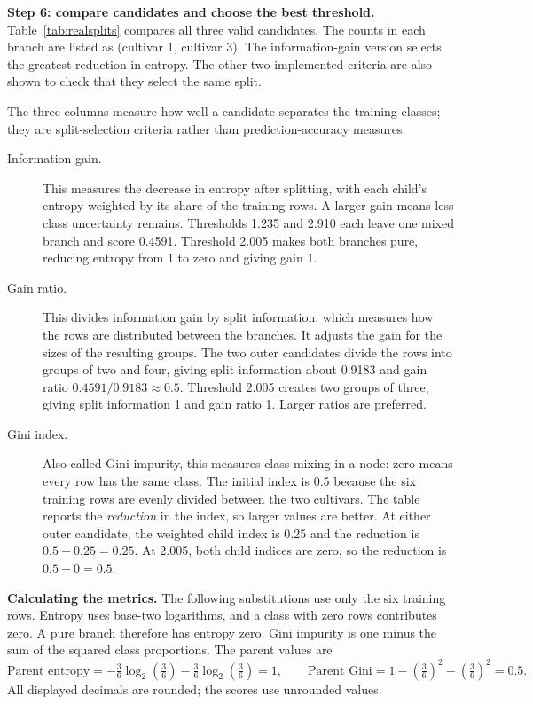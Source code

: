 \documentclass[11pt,letterpaper]{article}
\begin{document}
\textbf{Step 6: compare candidates and choose the best threshold.}
Table~\ref{tab:realsplits} compares all three valid candidates. The counts
in each branch are listed as (cultivar 1, cultivar 3). The information-gain
version selects the greatest reduction in entropy. The other two implemented
criteria are also shown to check that they select the same split.



The three columns measure how well a candidate separates the training
classes; they are split-selection criteria rather than prediction-accuracy
measures.
\begin{description}
\item[Information gain.] This measures the decrease in entropy after splitting,
with each child's entropy weighted by its share of the training rows.
A larger gain means less class uncertainty remains. Thresholds 1.235 and
2.910 each leave one mixed branch and score 0.4591. Threshold 2.005 makes
both branches pure, reducing entropy from 1 to zero and giving gain 1.
\item[Gain ratio.] This divides information gain by split information, which
measures how the rows are distributed between the branches. It adjusts the
gain for the sizes of the resulting groups. The two outer candidates divide
the rows into groups of two and four, giving split information about 0.9183
and gain ratio $0.4591/0.9183\approx0.5$. Threshold 2.005 creates two groups
of three, giving split information 1 and gain ratio 1. Larger ratios are
preferred.
\item[Gini index.] Also called Gini impurity, this measures class mixing in a
node: zero means every row has the same class. The initial index is 0.5
because the six training rows are evenly divided between the two cultivars.
The table reports the \emph{reduction} in the index, so larger values are
better. At either outer candidate, the weighted child index is 0.25 and
the reduction is $0.5-0.25=0.25$. At 2.005, both child indices are zero,
so the reduction is $0.5-0=0.5$.
\end{description}
\textbf{Calculating the metrics.}
The following substitutions use only the six training rows. Entropy uses
base-two logarithms, and a class with zero rows contributes zero. A pure
branch therefore has entropy zero. Gini impurity is one minus the sum of
the squared class proportions. The parent values are
\[
\text{Parent entropy}=-\tfrac36\log_2(\tfrac36)-\tfrac36\log_2(\tfrac36)=1,
\qquad
\text{Parent Gini}=1-(\tfrac36)^2-(\tfrac36)^2=0.5.
\]
All displayed decimals are rounded; the scores use unrounded values.
\end{document}
